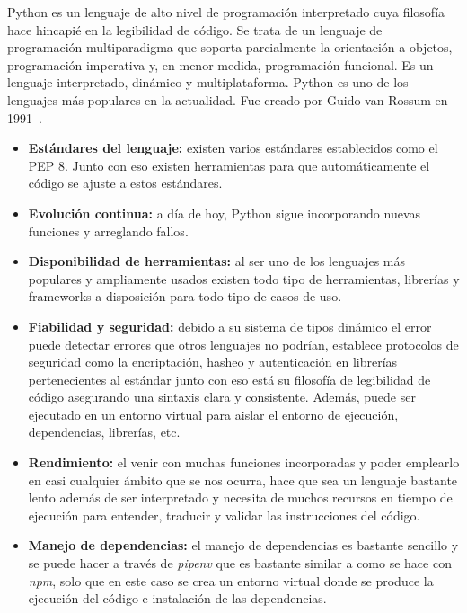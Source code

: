 Python es un lenguaje de alto nivel de programación interpretado cuya filosofía hace hincapié en la legibilidad de código. Se trata de un lenguaje de programación multiparadigma que soporta parcialmente la orientación a objetos, programación imperativa y, en menor medida, programación funcional. Es un lenguaje interpretado, dinámico y multiplataforma. Python es uno de los lenguajes más populares en la actualidad. Fue creado por Guido van Rossum en 1991~\cite{python-wiki}.

\begin{itemize}
    \item[\bien] \textbf{Estándares del lenguaje:} existen varios estándares establecidos como el PEP 8. Junto con eso existen herramientas para que automáticamente el código se ajuste a estos estándares.
    \item[\bien] \textbf{Evolución continua:} a día de hoy, Python sigue incorporando nuevas funciones y arreglando fallos.
    \item[\bien] \textbf{Disponibilidad de herramientas:} al ser uno de los lenguajes más populares y ampliamente usados existen todo tipo de herramientas, librerías y frameworks a disposición para todo tipo de casos de uso.
    \item[\bien] \textbf{Fiabilidad y seguridad:} debido a su sistema de tipos dinámico el error puede detectar errores que otros lenguajes no podrían, establece protocolos de seguridad como la encriptación, hasheo y autenticación en librerías pertenecientes al estándar junto con eso está su filosofía de legibilidad de código asegurando una sintaxis clara y consistente. Además, puede ser ejecutado en un entorno virtual para aislar el entorno de ejecución, dependencias, librerías, etc.
    \item[\regular] \textbf{Rendimiento:} el venir con muchas funciones incorporadas y poder emplearlo en casi cualquier ámbito que se nos ocurra, hace que sea un lenguaje bastante lento además de ser interpretado y necesita de muchos recursos en tiempo de ejecución para entender, traducir y validar las instrucciones del código.
    \item[\bien] \textbf{Manejo de dependencias:} el manejo de dependencias es bastante sencillo y se puede hacer a través de \textit{pipenv} que es bastante similar a como se hace con \textit{npm}, solo que en este caso se crea un entorno virtual donde se produce la ejecución del código e instalación de las dependencias.
\end{itemize}

